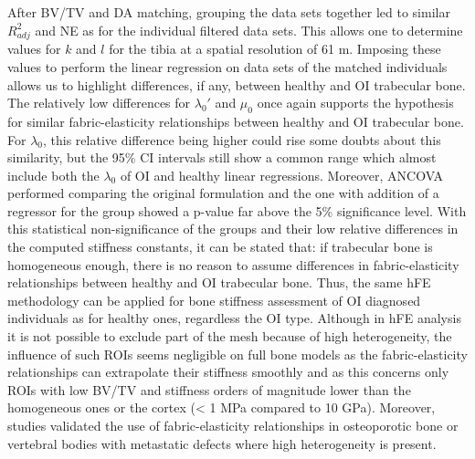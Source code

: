 \documentclass[a4paper,fleqn]{DC_ArtStyle}
\newcommand{\Add}[1]{{\color{blue}{#1}}}
\begin{document}
	After BV/TV and DA matching, grouping the data sets together led to similar $R^2_{adj}$ and NE as for the individual filtered data sets. This allows one to determine values for $k$ and $l$ for the tibia at a spatial resolution of 61 \si{\micro}m. Imposing these values to perform the linear regression on data sets of the matched individuals allows us to highlight differences, if any, between healthy and OI trabecular bone. The relatively low differences for $\lambda_0'$ and $\mu_0$ once again supports the hypothesis for similar fabric-elasticity relationships between healthy and OI trabecular bone. For $\lambda_0$, this relative difference being higher could rise some doubts about this similarity, but the 95\% CI intervals still show a common range which almost include both the $\lambda_0$ of OI and healthy linear regressions. Moreover, ANCOVA performed comparing the original formulation and the one with addition of a regressor for the group showed a p-value far above the 5\% significance level. With this statistical non-significance of the groups and their low relative differences in the computed stiffness constants, it can be stated that: if trabecular bone is homogeneous enough, there is no reason to assume differences in fabric-elasticity relationships between healthy and OI trabecular bone. Thus, the same hFE methodology can be applied for bone stiffness assessment of OI diagnosed individuals as for healthy ones, regardless the OI type. Although in hFE analysis it is not possible to exclude part of the mesh because of high heterogeneity, the influence of such ROIs seems negligible on full bone models as the fabric-elasticity relationships can extrapolate their stiffness smoothly and as this concerns only ROIs with low BV/TV and stiffness orders of magnitude lower than the homogeneous ones or the cortex (< 1 MPa compared to 10 GPa). Moreover, studies validated the use of fabric-elasticity relationships in osteoporotic bone \cite{Varga2011,Hosseini2017} or vertebral bodies with metastatic defects \cite{Stadelmann2020} where high heterogeneity is present.\\
	
	
\end{document}
